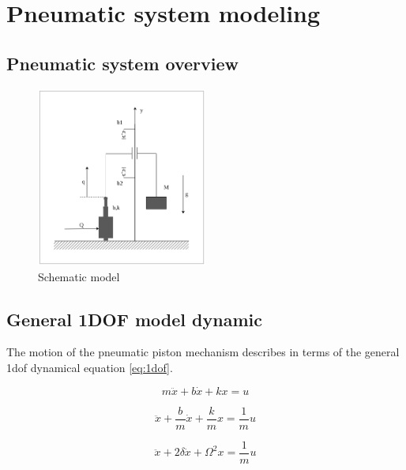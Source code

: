 \documentclass[class=article, crop=false]{standalone}
\begin{document}

\section{Pneumatic system modeling}

\subsection{Pneumatic system overview}

\begin{figure}[h!]
    \centering
    \includegraphics[width=0.5\textwidth]{model_draw_vec.png}
    \caption{Schematic model}
    \label{fig:model_draw}
\end{figure}


\subsection{General 1DOF model dynamic}
The motion of the pneumatic piston mechanism describes in terms of the
general 1dof dynamical equation \ref{eq:1dof}. 

\begin{equation}
    m\ddot{x} + b\dot{x} + kx = u
    \label{eq:1dof}
\end{equation}

\begin{equation*}
    \ddot{x} +\frac{b}{m}\dot{x} + \frac{k}{m}x = \frac{1}{m}u
\end{equation*}

\begin{equation*}
    \ddot{x} +2\delta\dot{x} + \Omega^2x = \frac{1}{m}u
\end{equation*}
\end{document}
